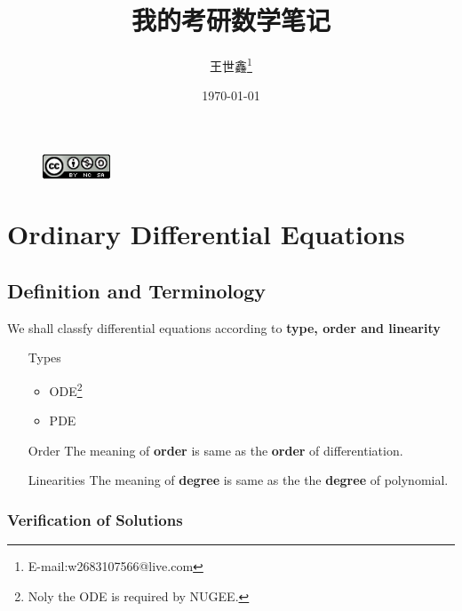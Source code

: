 \documentclass{beaulivre}
\title{我的考研数学笔记}
\author{王世鑫\thanks{E-mail:w2683107566@live.com}}
\date{\today}
\begin{document}

\begin{figure}[h]
    \centering
    \includegraphics[width=2cm]{cc-icon.png} 
\end{figure}


\tableofcontents

\mainmatter
\twocolumn


\cleardoublepage


\cleardoublepage


\cleardoublepage


\cleardoublepage
\chapter{Ordinary Differential Equations}
\section{Definition and Terminology} \label{def-de}
We shall classfy differential equations according to 
\textbf{type, order and linearity}

\begin{itemize}
    \item[Types]
        \begin{itemize}
            \item ODE\footnote{Noly the ODE is required by NUGEE.}
            \item PDE
        \end{itemize}
    \item[Order]
        The meaning of \textbf{order} is same as the 
        \textbf{order} of differentiation.
    \item[Linearities]
        The meaning of \textbf{degree} is same as the 
        the \textbf{degree} of polynomial.
\end{itemize}

\subsection{Verification of Solutions}
\end{document}
